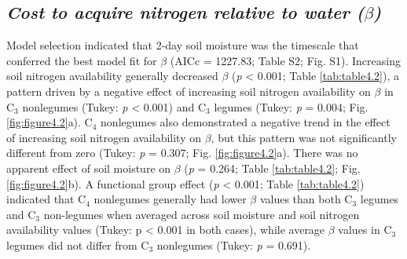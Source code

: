 \subsection{\textit{Cost to acquire nitrogen relative to water ($\beta$)}}
\noindent Model selection indicated that 2-day soil moisture was the timescale that conferred the best model fit for $\beta$ (AICc = 1227.83; Table S2; Fig. S1). Increasing soil nitrogen availability generally decreased $\beta$ (\textit{p} < 0.001; Table \ref{tab:table4.2}), a pattern driven by a negative effect of increasing soil nitrogen availability on $\beta$ in C$_3$ nonlegumes (Tukey: \textit{p} < 0.001) and C$_3$ legumes (Tukey: \textit{p} = 0.004; Fig. \ref{fig:figure4.2}a). C$_4$ nonlegumes also demonstrated a negative trend in the effect of increasing soil nitrogen availability on $\beta$, but this pattern was not significantly different from zero (Tukey: \textit{p} = 0.307; Fig. \ref{fig:figure4.2}a). There was no apparent effect of soil moisture on $\beta$ (\textit{p} = 0.264; Table \ref{tab:table4.2}; Fig. \ref{fig:figure4.2}b). A functional group effect (\textit{p} < 0.001; Table \ref{tab:table4.2}) indicated that C$_4$ nonlegumes generally had lower $\beta$ values than both C$_3$ legumes and C$_3$ non-legumes when averaged across soil moisture and soil nitrogen availability values (Tukey: p < 0.001 in both cases), while average $\beta$ values in C$_3$ legumes did not differ from C$_3$ nonlegumes (Tukey: \textit{p} = 0.691).

